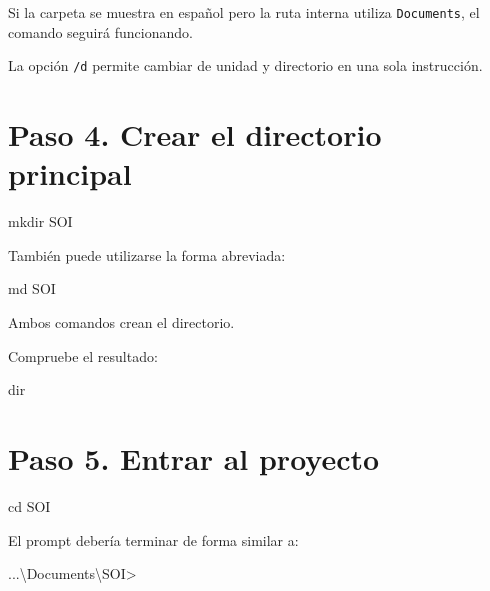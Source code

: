 \documentclass[
  spanish,
  letterpaper,
]{scrbook}
\newenvironment{Shaded}{\begin{snugshade}}{\end{snugshade}}
\newcommand{\BuiltInTok}[1]{\textcolor[rgb]{0.00,0.23,0.31}{#1}}
\newcommand{\NormalTok}[1]{\textcolor[rgb]{0.00,0.23,0.31}{#1}}
\begin{document}
Si la carpeta se muestra en español pero la ruta interna utiliza
\texttt{Documents}, el comando seguirá funcionando.

La opción \texttt{/d} permite cambiar de unidad y directorio en una sola
instrucción.

\section{Paso 4. Crear el directorio
principal}\label{paso-4.-crear-el-directorio-principal}

\begin{Shaded}
\begin{Highlighting}[]
\BuiltInTok{mkdir}\NormalTok{ SOI}
\end{Highlighting}
\end{Shaded}

También puede utilizarse la forma abreviada:

\begin{Shaded}
\begin{Highlighting}[]
\BuiltInTok{md}\NormalTok{ SOI}
\end{Highlighting}
\end{Shaded}

Ambos comandos crean el directorio.

Compruebe el resultado:

\begin{Shaded}
\begin{Highlighting}[]
\BuiltInTok{dir}
\end{Highlighting}
\end{Shaded}

\section{Paso 5. Entrar al proyecto}\label{paso-5.-entrar-al-proyecto}

\begin{Shaded}
\begin{Highlighting}[]
\BuiltInTok{cd}\NormalTok{ SOI}
\end{Highlighting}
\end{Shaded}

El prompt debería terminar de forma similar a:

\begin{Shaded}
\begin{Highlighting}[]
\NormalTok{...\textbackslash{}Documents\textbackslash{}SOI\textgreater{}}
\end{Highlighting}
\end{Shaded}
\end{document}
